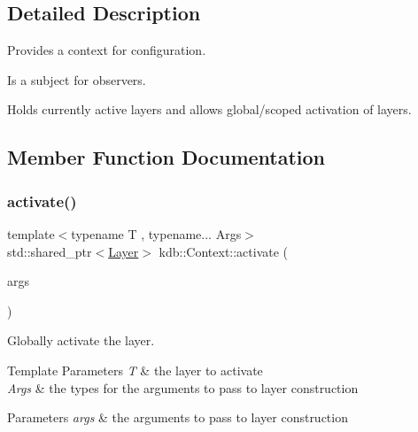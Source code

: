 \subsection{Detailed Description}
Provides a context for configuration. 

Is a subject for observers.

Holds currently active layers and allows global/scoped activation of layers. 

\subsection{Member Function Documentation}
\mbox{\label{classkdb_1_1Context_ae6313bea68b242fa50817c604a67e704}} 
\subsubsection{\texorpdfstring{activate()}{activate()}}
{\footnotesize\ttfamily template$<$typename T , typename... Args$>$ \\
std\+::shared\+\_\+ptr$<$\hyperlink{classkdb_1_1Layer}{Layer}$>$ kdb\+::\+Context\+::activate (\begin{DoxyParamCaption}\item[{Args \&\&...}]{args }\end{DoxyParamCaption})\hspace{0.3cm}{\ttfamily [inline]}}



Globally activate the layer. 


\begin{DoxyTemplParams}{Template Parameters}
{\em T} & the layer to activate \\
\hline
{\em Args} & the types for the arguments to pass to layer construction \\
\hline
\end{DoxyTemplParams}

\begin{DoxyParams}{Parameters}
{\em args} & the arguments to pass to layer construction \\
\hline
\end{DoxyParams}
\mbox{\label{classkdb_1_1Context_afcbfe897ee36eb4fee23640051122e54}} 
